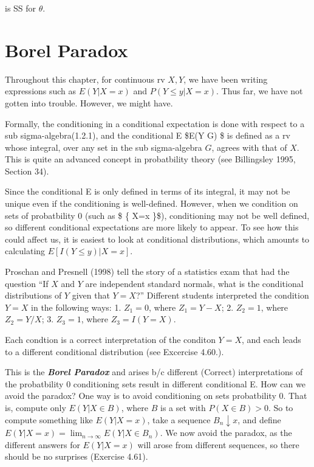 \documentclass[
]{book}
\begin{document}
is SS for \(\theta\).

\hypertarget{borel-paradox}{%
\section{Borel Paradox}\label{borel-paradox}}

Throughout this chapter, for continuous rv \(X, Y\), we have been writing expressions such as \(E(Y \rvert X=x)\) and \(P(Y \le y \rvert X=x)\). Thus far, we have not gotten into trouble. However, we might have.

Formally, the conditioning in a conditional expectation is done with respect to a sub sigma-algebra(1.2.1), and the conditional E \$E(Y \rvert G) \$ is defined as a rv whose integral, over any set in the sub sigma-algebra \(G\), agrees with that of \(X\). This is quite an advanced concept in probatbility theory (see Billingsley 1995, Section 34).

Since the conditional E is only defined in terms of its integral, it may not be unique even if the conditioning is well-defined. However, when we condition on sets of probatbility 0 (such as \$ \{ X=x \}\$), conditioning may not be well defined, so different conditional expectations are more likely to appear. To see how this could affect us, it is easiest to look at conditional distributions, which amounts to calculating \(E \left[ I(Y \le y) \rvert X=x \right]\).

Proschan and Presnell (1998) tell the story of a statistics exam that had the question ``If \(X\) and \(Y\) are independent standard normals, what is the conditional distributions of \(Y\) given that \(Y=X\)?'' Different students interpreted the condition \(Y=X\) in the following ways:
1. \(Z_1 = 0\), where \(Z_1 = Y-X\);
2. \(Z_2 = 1\), where \(Z_2 = Y/X\);
3. \(Z_3 = 1\), where \(Z_3 = I(Y=X)\).

Each condtion is a correct interpretation of the conditon \(Y=X\), and each leads to a different conditional distribution (see Excercise 4.60.).

This is the \textbf{\emph{Borel Paradox}} and arises b/c different (Correct) interpretations of the probatbility 0 conditioning sets result in different conditional E. How can we avoid the paradox? One way is to avoid conditioning on sets probatbility 0. That is, compute only \(E(Y \rvert X \in B )\), where \(B\) is a set with \(P (X \in B)>0\). So to compute something like \(E(Y \rvert X =x )\), take a sequence \(B_n \downarrow x\), and define \(E(Y \rvert X =x )= \lim_{n \rightarrow \infty} E(Y \rvert X \in B_n )\). We now avoid the paradox, as the different answers for \(E(Y \rvert X =x )\) will arose from different sequences, so there should be no surprises (Exercise 4.61).
\end{document}

